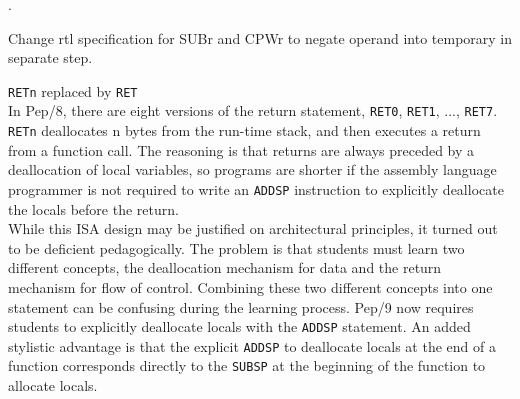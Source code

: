 \documentclass[10pt,fleqn]{book}
\newenvironment{exercises}
   {\begin{list}
      {\arabic{ecounter}.}
      {
         \usecounter{ecounter}
         \setcounter {ecounter}{0}
         \setlength\leftmargin{2pc}
         \setlength\labelwidth{6pc}
         \setlength\labelsep{1pc}
      }}
   {\end{list}}
\newcounter{ecounter}
\begin{document}
\begin{exercises}
\item Change rtl specification for SUBr and CPWr to negate operand into temporary in separate step.\\[6pt]
\item \verb|RETn| replaced by \verb|RET|\\[6pt]
In Pep/8, there are eight versions of the return statement, \verb|RET0|, \verb|RET1|, ..., \verb|RET7|.
\verb|RETn| deallocates n bytes from the run-time stack, and then executes a return from a function call.
The reasoning is that returns are always preceded by a deallocation of local variables, so programs are shorter if the assembly language programmer is not required to write an \verb|ADDSP| instruction to explicitly deallocate the locals before the return.\\[6pt]
While this ISA design may be justified on architectural principles, it turned out to be deficient pedagogically.
The problem is that students must learn two different concepts, the deallocation mechanism for data and the return mechanism for flow of control.
Combining these two different concepts into one statement can be confusing during the learning process.
Pep/9 now requires students to explicitly deallocate locals with the \verb|ADDSP| statement.
An added stylistic advantage is that the explicit \verb|ADDSP| to deallocate locals at the end of a function corresponds directly to the \verb|SUBSP| at the beginning of the function to allocate locals.


\end{exercises}
\end{document}
